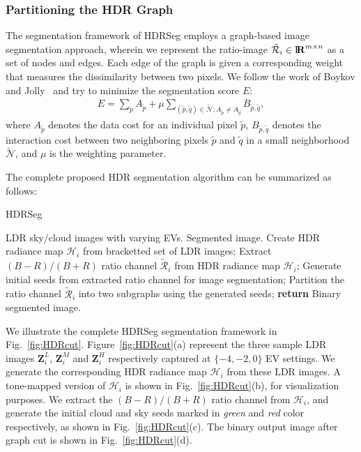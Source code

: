 \subsubsection{Partitioning the HDR Graph}
The segmentation framework of HDRSeg employs a graph-based image segmentation approach, wherein we represent the ratio-image $\tilde{\mathcal{R}}_i \in {\rm I\!\mathbf{R}}^{m \times n}$ as a set of nodes and edges. Each edge of the graph is given a corresponding weight that measures the dissimilarity between two pixels. We follow the work of Boykov and Jolly~\cite{Boykov_ICCV} and try to minimize the segmentation score $E$:
\begin{equation}\label{eq:agc}
\begin{aligned}
E=\sum_{\tilde{p}}^{}  A_{\tilde{p}} +\mu \sum_{(\tilde{p},\tilde{q}) \in \tilde{\mathcal{N}} ; A_{\tilde{p}} \neq A_{\tilde{q}}}^{}B_{\tilde{p},\tilde{q}},
\end{aligned}
\end{equation}
where $A_{\tilde{p}}$ denotes the data cost for an individual pixel $\tilde{p}$, $B_{\tilde{p},\tilde{q}}$ denotes the interaction cost between two neighboring pixels $\tilde{p}$ and $\tilde{q}$ in a small neighborhood $\tilde{\mathcal{N}}$, and $\mu$ is the weighting parameter.




The complete proposed HDR segmentation algorithm can be summarized as follows:

\begin{algorithm}[htb]
\caption{HDRSeg}
\label{alg:HDRSegalgo} 
\begin{algorithmic}[1]
\Require LDR sky/cloud images with varying EVs.
\Ensure Segmented image.
\State Create HDR radiance map $\mathcal{H}_i$ from bracketted set of LDR images;
\State Extract $(B-R)/(B+R)$ ratio channel $\tilde{\mathcal{R}}_i$ from HDR radiance map $\mathcal{H}_i$;
\State Generate initial seeds from extracted ratio channel for image segmentation;
\State Partition the ratio channel $\tilde{\mathcal{R}}_i$ into two subgraphs using the generated seeds;
\State \textbf{return} Binary segmented image.
\end{algorithmic}
\end{algorithm}


We illustrate the complete HDRSeg segmentation framework in Fig.~\ref{fig:HDRcut}. Figure~\ref{fig:HDRcut}(a) represent the three sample LDR images $\mathbf{Z}_i^{L}$, $\mathbf{Z}_i^{M}$ and $\mathbf{Z}_i^{H}$ respectively captured at $\{-4,-2,0\}$ EV settings. We generate the corresponding HDR radiance map $\mathcal{H}_i$ from these LDR images. A tone-mapped version of $\mathcal{H}_i$ is shown in Fig.~\ref{fig:HDRcut}(b), for visualization purposes. We extract the $(B-R)/(B+R)$ ratio channel from $\mathcal{H}_i$, and generate the initial cloud and sky seeds marked in \emph{green} and \emph{red} color respectively, as shown in Fig.~\ref{fig:HDRcut}(c). The binary output image after graph cut is shown in Fig.~\ref{fig:HDRcut}(d).



